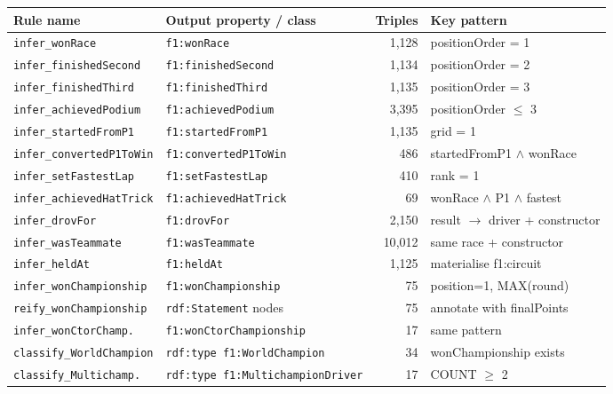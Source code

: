 \begin{center}
\begin{tabularx}{\linewidth}{@{}lXrp{3.5cm}@{}}
\toprule
\textbf{Rule name} & \textbf{Output property / class} & \textbf{Triples} & \textbf{Key pattern} \\
\midrule
\texttt{infer\_wonRace}          & \texttt{f1:wonRace}             & 1{,}128  & positionOrder = 1 \\
\texttt{infer\_finishedSecond}   & \texttt{f1:finishedSecond}      & 1{,}134  & positionOrder = 2 \\
\texttt{infer\_finishedThird}    & \texttt{f1:finishedThird}       & 1{,}135  & positionOrder = 3 \\
\texttt{infer\_achievedPodium}   & \texttt{f1:achievedPodium}      & 3{,}395  & positionOrder $\leq$ 3 \\
\texttt{infer\_startedFromP1}    & \texttt{f1:startedFromP1}       & 1{,}135  & grid = 1 \\
\texttt{infer\_convertedP1ToWin} & \texttt{f1:convertedP1ToWin}   & 486      & startedFromP1 $\wedge$ wonRace \\
\texttt{infer\_setFastestLap}    & \texttt{f1:setFastestLap}       & 410      & rank = 1 \\
\texttt{infer\_achievedHatTrick} & \texttt{f1:achievedHatTrick}    & 69       & wonRace $\wedge$ P1 $\wedge$ fastest \\
\texttt{infer\_drovFor}          & \texttt{f1:drovFor}             & 2{,}150  & result $\to$ driver + constructor \\
\texttt{infer\_wasTeammate}      & \texttt{f1:wasTeammate}         & 10{,}012 & same race + constructor \\
\texttt{infer\_heldAt}           & \texttt{f1:heldAt}              & 1{,}125  & materialise f1:circuit \\
\texttt{infer\_wonChampionship}  & \texttt{f1:wonChampionship}     & 75       & position=1, MAX(round) \\
\texttt{reify\_wonChampionship}  & \texttt{rdf:Statement} nodes    & 75       & annotate with finalPoints \\
\texttt{infer\_wonCtorChamp.}    & \texttt{f1:wonCtorChampionship} & 17       & same pattern \\
\texttt{classify\_WorldChampion} & \texttt{rdf:type f1:WorldChampion}       & 34  & wonChampionship exists \\
\texttt{classify\_Multichamp.}   & \texttt{rdf:type f1:MultichampionDriver} & 17  & COUNT $\geq$ 2 \\

\end{tabularx}
\end{center}
